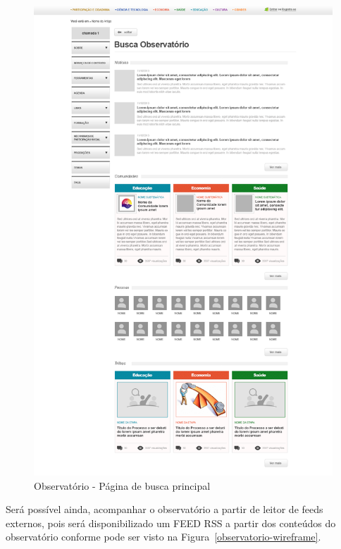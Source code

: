 \documentclass[12pt]{article}
\begin{document}
\begin{figure}[h]
\center
\includegraphics[scale=0.25]{observatorio-busca.png}
\caption{Observatório - Página de busca principal}
\label{observatorio-busca}
\end{figure}

Será possível ainda, acompanhar o observatório a partir de leitor de feeds
externos, pois será disponibilizado um FEED RSS a partir dos conteúdos do
observatório conforme pode ser visto na Figura~\ref{observatorio-wireframe}.
\end{document}
